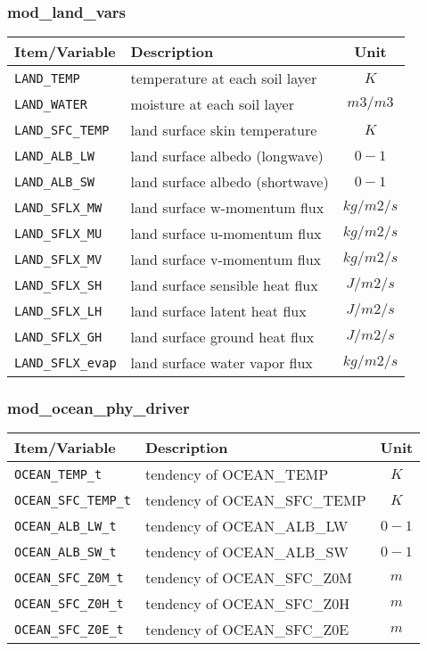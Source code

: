\subsubsection{mod\_land\_vars}
 \begin{tabularx}{150mm}{|l|X|c|} \hline
 \rowcolor[gray]{0.9} Item/Variable & Description  & Unit \\\hline
  \verb|LAND_TEMP|       & temperature at each soil layer   &  $K$      \\\hline
  \verb|LAND_WATER|      & moisture at each soil layer      &  $m3/m3$  \\\hline
  \verb|LAND_SFC_TEMP|   & land surface skin temperature    &  $K$      \\\hline
  \verb|LAND_ALB_LW|     & land surface albedo (longwave)   &  $0-1$    \\\hline
  \verb|LAND_ALB_SW|     & land surface albedo (shortwave)  &  $0-1$    \\\hline
  \verb|LAND_SFLX_MW|    & land surface w-momentum flux     &  $kg/m2/s$ \\\hline
  \verb|LAND_SFLX_MU|    & land surface u-momentum flux     &  $kg/m2/s$ \\\hline
  \verb|LAND_SFLX_MV|    & land surface v-momentum flux     &  $kg/m2/s$ \\\hline
  \verb|LAND_SFLX_SH|    & land surface sensible heat flux  &  $J/m2/s$ \\\hline
  \verb|LAND_SFLX_LH|    & land surface latent heat flux    &  $J/m2/s$ \\\hline
  \verb|LAND_SFLX_GH|    & land surface ground heat flux    &  $J/m2/s$ \\\hline
  \verb|LAND_SFLX_evap|  & land surface water vapor flux    &  $kg/m2/s$ \\\hline
 \end{tabularx}

\subsubsection{mod\_ocean\_phy\_driver}
 \begin{tabularx}{150mm}{|l|X|c|} \hline
 \rowcolor[gray]{0.9} Item/Variable & Description  & Unit \\\hline
  \verb|OCEAN_TEMP_t|     & tendency of OCEAN\_TEMP     & $K$ \\\hline
  \verb|OCEAN_SFC_TEMP_t| & tendency of OCEAN\_SFC\_TEMP & $K$ \\\hline
  \verb|OCEAN_ALB_LW_t|   & tendency of OCEAN\_ALB\_LW   & $0-1$ \\\hline
  \verb|OCEAN_ALB_SW_t|   & tendency of OCEAN\_ALB\_SW   & $0-1$ \\\hline
  \verb|OCEAN_SFC_Z0M_t|  & tendency of OCEAN\_SFC\_Z0M  & $m$ \\\hline
  \verb|OCEAN_SFC_Z0H_t|  & tendency of OCEAN\_SFC\_Z0H  & $m$ \\\hline
  \verb|OCEAN_SFC_Z0E_t|  & tendency of OCEAN\_SFC\_Z0E  & $m$ \\\hline
 \end{tabularx}

